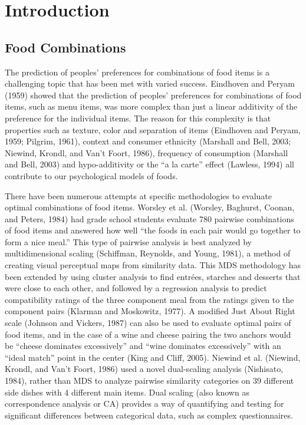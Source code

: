 \chapter{Introduction}

\section{Food Combinations}
The prediction of peoples’ preferences for combinations of food items is a challenging topic that has been met with varied success.  Eindhoven and Peryam (1959) showed that the prediction of peoples’ preferences for combinations of food items, such as menu items, was more complex than just a linear additivity of the preference for the individual items.  The reason for this complexity is that properties such as texture, color and separation of items \citep{Eindhoven1959} (Eindhoven and Peryam, 1959; Pilgrim, 1961), context and consumer ethnicity (Marshall and Bell, 2003; Niewind, Krondl, and Van't Foort, 1986), frequency of consumption (Marshall and Bell, 2003) and hypo-additivity or the “a la carte” effect (Lawless, 1994) all contribute to our psychological models of foods.  

There have been numerous attempts at specific methodologies to evaluate optimal combinations of food items.  Worsley et al. (Worsley, Baghurst, Coonan, and Peters, 1984) had grade school students evaluate 780 pairwise combinations of food items and answered how well “the foods in each pair would go together to form a nice meal.” This type of pairwise analysis is best analyzed by multidimensional scaling (Schiffman, Reynolds, and Young, 1981), a method of creating visual perceptual maps from similarity data. This MDS methodology has been extended by using cluster analysis to find entrées, starches and desserts that were close to each other, and followed by a regression analysis to predict compatibility ratings of the three component meal from the ratings given to the component pairs (Klarman and Moskowitz, 1977).  A modified Just About Right scale (Johnson and Vickers, 1987) can also be used to evaluate optimal pairs of food items, and in the case of a wine and cheese pairing the two anchors would be “cheese dominates excessively” and “wine dominates excessively” with an “ideal match” point in the center (King and Cliff, 2005).  Niewind et al. (Niewind, Krondl, and Van't Foort, 1986) used a novel dual-scaling analysis (Nishisato, 1984), rather than MDS to analyze pairwise similarity categories on 39 different side dishes with 4 different main items.  Dual scaling (also known as correspondence analysis or CA) provides a way of quantifying and testing for significant differences between categorical data, such as complex questionnaires.

